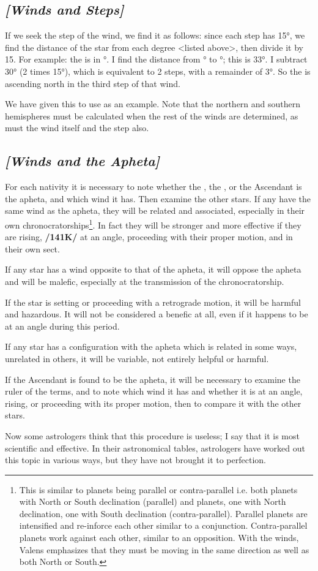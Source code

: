 \subsection{\textit{[Winds and Steps]}}
If we seek the step of the wind, we find it as follows: since each step has 15°, we find the distance of the star from each degree <listed above>, then divide it by 15. For example: the \Sun\xspace is in \Aquarius\xspace 22°. I find the distance from \Capricorn\xspace 19° to \Aquarius\xspace 22°; this is 33°. I subtract 30° (2 times 15°), which is equivalent to 2 steps, with a remainder of 3°. So the \Sun\xspace is ascending north in the third step of that wind.

We have given this to use as an example. Note that the northern and southern hemispheres must be calculated when the rest of the winds are determined, as must the wind itself and the step also.

\subsection{\textit{[Winds and the Apheta]}}
For each nativity it is necessary to note whether the \Sun, the \Moon, or the Ascendant is the apheta, and which wind it has. Then examine the other stars. If any have the same wind as the apheta, they will be related and associated, especially in their own chronocratorships\footnote{This is similar to planets being parallel or contra-parallel i.e. both planets with North or South declination (parallel) and planets, one with North declination, one with South declination (contra-parallel). Parallel planets are intensified and re-inforce each other similar to a conjunction. Contra-parallel planets work against each other, similar to an opposition. With the winds, Valens emphasizes that they must be moving in the same direction as well as both North or South.}. \mndl In fact they will be stronger and more effective if they are rising, \textbf{/141K/} at an angle, proceeding with their proper motion, and in their own sect.

If any star has a wind opposite to that of the apheta, it will oppose the apheta and will be malefic, especially at the transmission of the chronocratorship. 

If the star is setting or proceeding with a retrograde
motion, it will be harmful and hazardous. It will not be considered a benefic at all, even if it happens to be
at an angle during this period. 

If any star has a configuration with the apheta which is related in some ways, unrelated in others, it will be variable, not entirely helpful or harmful. 

If the Ascendant is found to be the apheta, it will be necessary to examine the ruler of the terms, and to note which wind it has and whether it is at an angle, rising, or proceeding with its proper motion, then to compare it with the other stars.

Now some astrologers think that this procedure is useless; I say that it is most scientific and effective. In their astronomical tables, astrologers have worked out this topic in various ways, but they have not brought it to perfection.

\newpage
